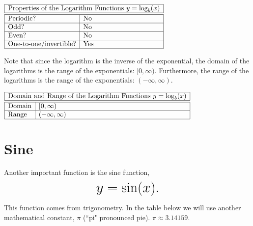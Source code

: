 \documentclass[nooutcomes]{ximera}
\begin{document}
\begin{center}
$
\begin{array}{|l|l|}
 \hline
 \multicolumn{2}{|c|}{\text{\normalfont Properties of the Logarithm Functions } y=\log_b(x)} \\
\hline
 \hline
\text{Periodic?} & \text{No} \\ \hline
\text{Odd?} & \text{No} \\ \hline
\text{Even?} & \text{No} \\ \hline
\text{One-to-one/invertible?} & \text{Yes} \\ \hline
\end{array}
$
\end{center}

Note that since the logarithm is the inverse of the exponential, the domain of the logarithms is the range of the exponentials: $[0, \infty)$. Furthermore, the range of the logarithms is the range of the exponentials: $(-\infty, \infty)$. 

\begin{center}
$
\begin{array}{|l|l|}
 \hline
 \multicolumn{2}{|c|}{\text{\normalfont Domain and Range of the Logarithm Functions } y=\log_b(x)} \\
\hline
 \hline
\text{Domain} & [0, \infty) \\ \hline
\text{Range} & (-\infty, \infty) \\ \hline
\end{array}
$
\end{center}

\newpage


\section{Sine}
Another important function is the sine function, $$ \mbox{\huge $y=\sin(x)$.}$$ 


This function comes from trigonometry. In the table below we will use another mathematical constant, $\pi$ (``pi" pronounced pie). $\pi \approx 3.14159$.

\begin{image}
\end{image}
\end{document}
